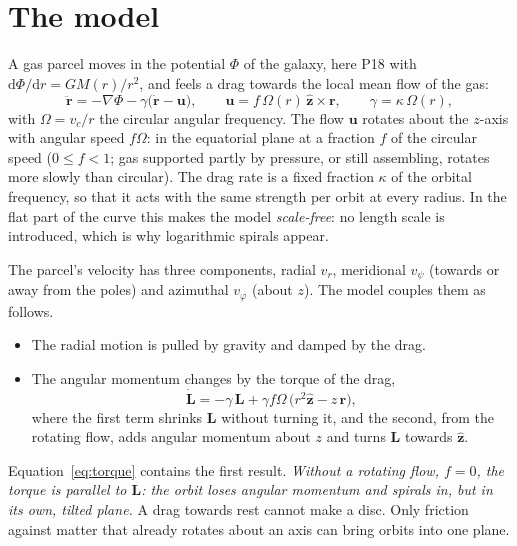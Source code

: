 \documentclass[11pt,a4paper]{article}
\newcommand{\dd}{\mathrm{d}}
\begin{document}
\section{The model}

A gas parcel moves in the potential $\Phi$ of the galaxy, here P18 with
$\dd\Phi/\dd r=GM(r)/r^2$, and feels a drag towards the local mean flow of the gas:
\begin{equation}
  \ddot{\mathbf r}=-\nabla\Phi-\gamma\bigl(\dot{\mathbf r}-\mathbf u\bigr),
  \qquad
  \mathbf u=f\,\Omega(r)\,\hat{\mathbf z}\times\mathbf r,
  \qquad
  \gamma=\kappa\,\Omega(r),
  \label{eq:model}
\end{equation}
with $\Omega=v_c/r$ the circular angular frequency. The flow $\mathbf u$ rotates about
the $z$-axis with angular speed $f\Omega$: in the equatorial plane at a fraction $f$
of the circular speed ($0\le f<1$; gas supported partly by pressure, or still
assembling, rotates more slowly than circular). The drag rate is a fixed fraction
$\kappa$ of the orbital frequency, so that it acts with the same strength per orbit
at every radius. In the flat part of the curve this makes the model
\emph{scale-free}: no length scale is introduced, which is why logarithmic spirals
appear.

The parcel's velocity has three components, radial $v_r$, meridional $v_\psi$
(towards or away from the poles) and azimuthal $v_\varphi$ (about $z$). The model
couples them as follows.
\begin{itemize}
\item The radial motion is pulled by gravity and damped by the drag.
\item The angular momentum changes by the torque of the drag,
  \begin{equation}
    \dot{\mathbf L}=-\gamma\,\mathbf L
    +\gamma f\Omega\,\bigl(r^2\hat{\mathbf z}-z\,\mathbf r\bigr),
    \label{eq:torque}
  \end{equation}
  where the first term shrinks $\mathbf L$ without turning it, and the second, from
  the rotating flow, adds angular momentum about $z$ and turns $\mathbf L$ towards
  $\hat{\mathbf z}$.
\end{itemize}
Equation~\eqref{eq:torque} contains the first result. \emph{Without a rotating flow,
$f=0$, the torque is parallel to $\mathbf L$: the orbit loses angular momentum and
spirals in, but in its own, tilted plane.} A drag towards rest cannot make a disc.
Only friction against matter that already rotates about an axis can bring orbits
into one plane.
\end{document}
